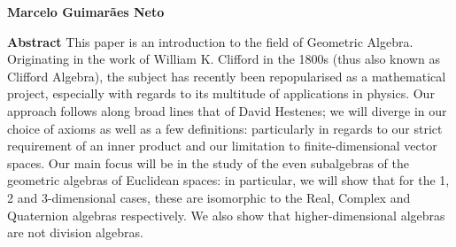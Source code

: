 \thispagestyle{plain}
\begin{center}
	\Large
	\textbf{\thtitle}
	    
	\vspace{0.4cm}
	\large
	\thsubtitle
	
	\vspace{0.4cm}
	\textbf{Marcelo Guimarães Neto}
\end{center}
\vspace{0.9cm}
\textbf{Abstract}
	This paper is an introduction to the field of Geometric Algebra. Originating in the work of William K. Clifford in the 1800s (thus also known as Clifford Algebra), the subject has recently been repopularised as a mathematical project, especially with regards to its multitude of applications in physics. Our approach follows along broad lines that of David Hestenes; we will diverge in our choice of axioms as well as a few definitions: particularly in regards to our strict requirement of an inner product and our limitation to finite-dimensional vector spaces. Our main focus will be in the study of the even subalgebras of the geometric algebras of Euclidean spaces: in particular, we will show that for the 1, 2 and 3-dimensional cases, these are isomorphic to the Real, Complex and Quaternion algebras respectively. We also show that higher-dimensional algebras are not division algebras.
